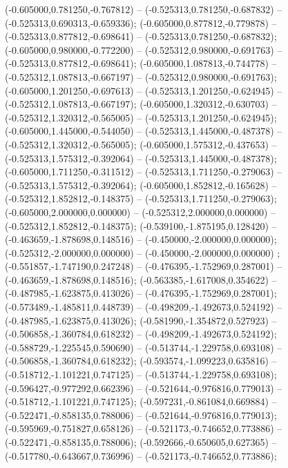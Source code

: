  (-0.605000,0.781250,-0.767812) -- (-0.525313,0.781250,-0.687832) -- (-0.525313,0.690313,-0.659336);
 (-0.605000,0.877812,-0.779878) -- (-0.525313,0.877812,-0.698641) -- (-0.525313,0.781250,-0.687832);
 (-0.605000,0.980000,-0.772200) -- (-0.525312,0.980000,-0.691763) -- (-0.525313,0.877812,-0.698641);
 (-0.605000,1.087813,-0.744778) -- (-0.525312,1.087813,-0.667197) -- (-0.525312,0.980000,-0.691763);
 (-0.605000,1.201250,-0.697613) -- (-0.525313,1.201250,-0.624945) -- (-0.525312,1.087813,-0.667197);
 (-0.605000,1.320312,-0.630703) -- (-0.525312,1.320312,-0.565005) -- (-0.525313,1.201250,-0.624945);
 (-0.605000,1.445000,-0.544050) -- (-0.525313,1.445000,-0.487378) -- (-0.525312,1.320312,-0.565005);
 (-0.605000,1.575312,-0.437653) -- (-0.525313,1.575312,-0.392064) -- (-0.525313,1.445000,-0.487378);
 (-0.605000,1.711250,-0.311512) -- (-0.525313,1.711250,-0.279063) -- (-0.525313,1.575312,-0.392064);
 (-0.605000,1.852812,-0.165628) -- (-0.525312,1.852812,-0.148375) -- (-0.525313,1.711250,-0.279063);
 (-0.605000,2.000000,0.000000) -- (-0.525312,2.000000,0.000000) -- (-0.525312,1.852812,-0.148375);
 (-0.539100,-1.875195,0.128420) -- (-0.463659,-1.878698,0.148516) -- (-0.450000,-2.000000,0.000000);
 (-0.525312,-2.000000,0.000000) -- (-0.450000,-2.000000,0.000000) ;
 (-0.551857,-1.747190,0.247248) -- (-0.476395,-1.752969,0.287001) -- (-0.463659,-1.878698,0.148516);
 (-0.563385,-1.617008,0.354622) -- (-0.487985,-1.623875,0.413026) -- (-0.476395,-1.752969,0.287001);
 (-0.573489,-1.485811,0.448739) -- (-0.498209,-1.492673,0.524192) -- (-0.487985,-1.623875,0.413026);
 (-0.581990,-1.354872,0.527923) -- (-0.506858,-1.360784,0.618232) -- (-0.498209,-1.492673,0.524192);
 (-0.588729,-1.225545,0.590690) -- (-0.513744,-1.229758,0.693108) -- (-0.506858,-1.360784,0.618232);
 (-0.593574,-1.099223,0.635816) -- (-0.518712,-1.101221,0.747125) -- (-0.513744,-1.229758,0.693108);
 (-0.596427,-0.977292,0.662396) -- (-0.521644,-0.976816,0.779013) -- (-0.518712,-1.101221,0.747125);
 (-0.597231,-0.861084,0.669884) -- (-0.522471,-0.858135,0.788006) -- (-0.521644,-0.976816,0.779013);
 (-0.595969,-0.751827,0.658126) -- (-0.521173,-0.746652,0.773886) -- (-0.522471,-0.858135,0.788006);
 (-0.592666,-0.650605,0.627365) -- (-0.517780,-0.643667,0.736996) -- (-0.521173,-0.746652,0.773886);
